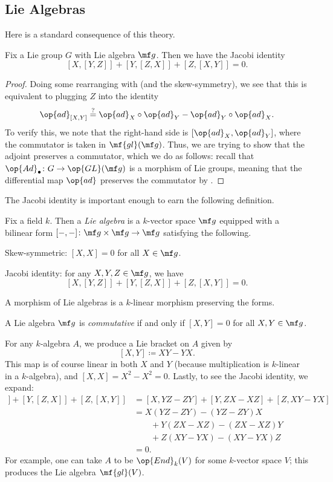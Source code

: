 \documentclass[../notes.tex]{subfiles}
\begin{document}
\subsection{Lie Algebras}
Here is a standard consequence of this theory.
\begin{proposition} \label{prop:jacobi}
	Fix a Lie group $G$ with Lie algebra $\mf g$. Then we have the Jacobi identity
	\[[X,[Y,Z]]+[Y,[Z,X]]+[Z,[X,Y]]=0.\]
\end{proposition}
\begin{proof}
	Doing some rearranging with  (and the skew-symmetry), we see that this is equivalent to plugging $Z$ into the identity
	\[{\op{ad}_{[X,Y]}}\stackrel?={\op{ad}_X}\circ{\op{ad}_Y}-{\op{ad}_Y}\circ{\op{ad}_X}.\]
	To verify this, we note that the right-hand side is $[{\op{ad}_X},{\op{ad}_Y}]$, where the commutator is taken in $\mf{gl}(\mf g)$. Thus, we are trying to show that the adjoint preserves a commutator, which we do as follows: recall that $\op{Ad}_\bullet\colon G\to\op{GL}(\mf g)$ is a morphism of Lie groups, meaning that the differential map $\op{ad}$ preserves the commutator by .
\end{proof}
The Jacobi identity is important enough to earn the following definition.
\begin{definition}
	Fix a field $k$. Then a \textit{Lie algebra} is a $k$-vector space $\mf g$ equipped with a bilinear form $[-,-]\colon\mf g\times\mf g\to\mf g$ satisfying the following.
	\begin{listalph}
		\item Skew-symmetric: $[X,X]=0$ for all $X\in\mf g$.
		\item Jacobi identity: for any $X,Y,Z\in\mf g$, we have
		\[[X,[Y,Z]]+[Y,[Z,X]]+[Z,[X,Y]]=0.\]
	\end{listalph}
	A morphism of Lie algebras is a $k$-linear morphism preserving the forms.
\end{definition}
\begin{definition}[commutative]
	A Lie algebra $\mf g$ is \textit{commutative} if and only if $[X,Y]=0$ for all $X,Y\in\mf g$.
\end{definition}
\begin{example}
	For any $k$-algebra $A$, we produce a Lie bracket on $A$ given by
	\[[X,Y]\coloneqq XY-YX.\]
	This map is of course linear in both $X$ and $Y$ (because multiplication is $k$-linear in a $k$-algebra), and $[X,X]=X^2-X^2=0$. Lastly, to see the Jacobi identity, we expand:
	\begin{align*}
		[X,[Y,Z]]+[Y,[Z,X]]+[Z,[X,Y]] &= [X,YZ-ZY]+[Y,ZX-XZ]+[Z,XY-YX] \\
		&= X(YZ-ZY)-(YZ-ZY)X \\
		&\qquad+Y(ZX-XZ)-(ZX-XZ)Y \\
		&\qquad+Z(XY-YX)-(XY-YX)Z \\
		&= 0.
	\end{align*}
	For example, one can take $A$ to be $\op{End}_k(V)$ for some $k$-vector space $V$; this produces the Lie algebra $\mf{gl}(V)$.
\end{example}
\end{document}

